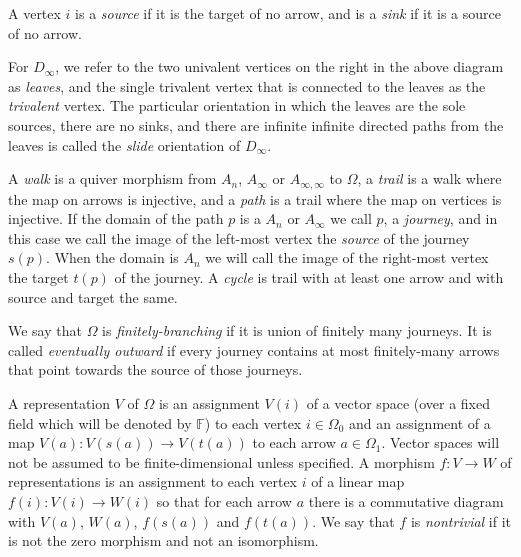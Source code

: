 \documentclass{article}
\newcommand{\maps}{:}
\begin{document}
 


A vertex $i$ is a \emph{source} if it is the target of no arrow, and is a \emph{sink} if it is a source of no arrow.  

For $D_\infty$, we refer to the two univalent vertices on the right in the above diagram as \emph{leaves}, and the single trivalent vertex that is connected to the leaves as the \emph{trivalent} vertex.  The particular orientation in which  the leaves are the sole sources, there are no sinks, and there are  infinite infinite directed paths from the leaves is called the \emph{slide} orientation of $D_\infty$.


A \emph{walk} is a quiver morphism from $A_n$, $A_\infty$ or $A_{\infty, \infty}$ to $\Omega$, a \emph{trail} is a walk where the map on arrows is injective, and a \emph{path} is a trail where the map on vertices is injective.  If the domain of the path $p$ is a  $A_n$ or $A_\infty$ we call $p$, a \emph{journey}, and in this case we call the image of the left-most vertex the \emph{source} of the journey $s(p)$. When the domain is $A_n$ we will call the image of the right-most vertex the target $t(p)$ of the journey. A \emph{cycle} is trail with at least one arrow and with  source and target  the same.



We say that $\Omega$ is \emph{finitely-branching} if it is union of finitely many journeys.  It is called \emph{eventually outward} if every journey contains at most finitely-many arrows that point towards the source of those journeys.


A representation $V$ of $\Omega$ is an assignment $V(i)$ of a vector space (over a fixed field which will be denoted by $\mathbb{F}$) to each vertex $i \in \Omega_0$ and an assignment of a map $V(a)\maps V(s(a)) \to V(t(a))$ to each arrow $a \in \Omega_1$.  Vector spaces will not be assumed to be finite-dimensional unless specified.  A morphism $f \maps V \to W$ of representations is an assignment to each vertex $i$ of a linear map $f(i)\maps V(i) \to W(i)$ so that for each arrow $a$ there is a commutative diagram with $V(a)$, $W(a)$, $f(s(a))$ and $f(t(a))$. We say that $f$ is \emph{nontrivial} if it is not the zero morphism and not an isomorphism. 
\end{document}
